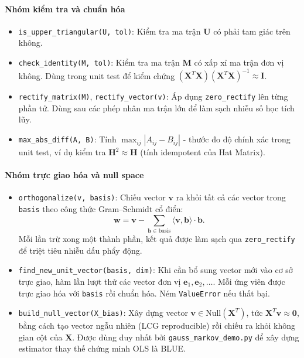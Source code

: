 \paragraph{Nhóm kiểm tra và chuẩn hóa}

\begin{itemize}
    \item \texttt{is\_upper\_triangular(U, tol)}: Kiểm tra ma trận $\mathbf{U}$ có phải tam giác trên không.
    \item \texttt{check\_identity(M, tol)}: Kiểm tra ma trận $\mathbf{M}$ có xấp xỉ ma trận đơn vị không. Dùng trong unit test để kiểm chứng $(\mathbf{X}^T\mathbf{X})(\mathbf{X}^T\mathbf{X})^{-1} \approx \mathbf{I}$.
    \item \texttt{rectify\_matrix(M)}, \texttt{rectify\_vector(v)}: Áp dụng \texttt{zero\_rectify} lên từng phần tử. Dùng sau các phép nhân ma trận lớn để làm sạch nhiễu số học tích lũy.
    \item \texttt{max\_abs\_diff(A, B)}: Tính $\max_{ij}|A_{ij} - B_{ij}|$ - thước đo độ chính xác trong unit test, ví dụ kiểm tra $\mathbf{H}^2 \approx \mathbf{H}$ (tính idempotent của Hat Matrix).
\end{itemize}

\paragraph{Nhóm trực giao hóa và null space}

\begin{itemize}
    \item \texttt{orthogonalize(v, basis)}: Chiếu vector $\mathbf{v}$ ra khỏi tất cả các vector trong \texttt{basis} theo công thức Gram--Schmidt cổ điển:
    \begin{equation}
        \mathbf{w} = \mathbf{v} - \sum_{\mathbf{b} \in \text{basis}}
        \langle \mathbf{v}, \mathbf{b} \rangle \cdot \mathbf{b}.
    \end{equation}
    Mỗi lần trừ xong một thành phần, kết quả được làm sạch qua \texttt{zero\_rectify} để triệt tiêu nhiễu dấu phẩy động.
    \item \texttt{find\_new\_unit\_vector(basis, dim)}: Khi cần bổ sung vector mới vào cơ sở trực giao, hàm lần lượt thử các vector đơn vị $\mathbf{e}_1, \mathbf{e}_2, \ldots$. Mỗi ứng viên được trực giao hóa với \texttt{basis} rồi chuẩn hóa. Ném \texttt{ValueError} nếu thất bại.
    \item \texttt{build\_null\_vector(X\_bias)}: Xây dựng vector $\mathbf{v} \in \mathrm{Null}(\mathbf{X}^T)$, tức $\mathbf{X}^T\mathbf{v} \approx \mathbf{0}$, bằng cách tạo vector ngẫu nhiên (LCG reproducible) rồi chiếu ra khỏi không gian cột của $\mathbf{X}$. Được dùng duy nhất bởi \texttt{gauss\_markov\_demo.py} để xây dựng estimator thay thế chứng minh OLS là BLUE.
\end{itemize}

